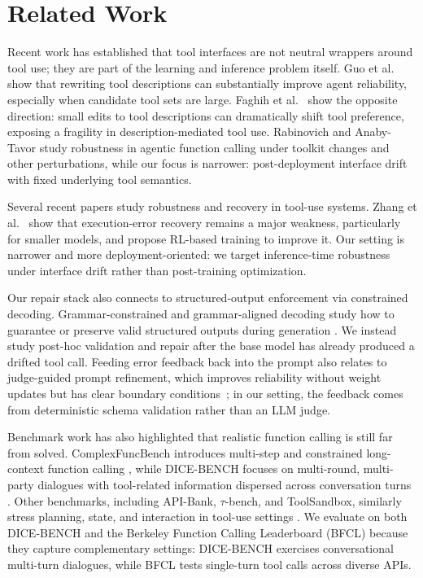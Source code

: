 \documentclass[runningheads]{llncs}
\begin{document}
\section{Related Work}
Recent work has established that tool interfaces are not neutral wrappers around
tool use; they are part of the learning and inference problem itself.
Guo et al.~\cite{guo2026rewrite} show that rewriting tool descriptions can
substantially improve agent reliability, especially when candidate tool sets are
large. Faghih et al.~\cite{faghih2025gaming} show the opposite direction:
small edits to tool descriptions can dramatically shift tool preference, exposing a
fragility in description-mediated tool use. Rabinovich and Anaby-Tavor
\cite{rabinovich2025robustness} study robustness in agentic function calling under
toolkit changes and other perturbations, while our focus is narrower: post-deployment
interface drift with fixed underlying tool semantics.

Several recent papers study robustness and recovery in tool-use systems.
Zhang et al.~\cite{zhang2026fission} show that execution-error recovery remains a
major weakness, particularly for smaller models, and propose RL-based training to
improve it. Our setting is narrower and more deployment-oriented: we target
inference-time robustness under interface drift rather than post-training
optimization.

Our repair stack also connects to structured-output enforcement via constrained
decoding. Grammar-constrained and grammar-aligned decoding study how to guarantee
or preserve valid structured outputs during generation
\cite{geng2023grammar,park2024grammar}. We instead study post-hoc validation and
repair after the base model has already produced a drifted tool call.
Feeding error feedback back into the prompt also relates to judge-guided prompt
refinement, which improves reliability without weight updates but has clear
boundary conditions~\cite{chattopadhyay2026metatuning}; in our setting, the
feedback comes from deterministic schema validation rather than an LLM judge.

Benchmark work has also highlighted that realistic function calling is still far from
solved. ComplexFuncBench introduces multi-step and constrained long-context function
calling \cite{zhong2025complexfuncbench}, while DICE-BENCH focuses on multi-round,
multi-party dialogues with tool-related information dispersed across conversation
turns \cite{jang2025dicebench}. Other benchmarks, including API-Bank,
$\tau$-bench, and ToolSandbox, similarly stress planning, state, and interaction
in tool-use settings \cite{li2023apibank,yao2024taubench,lu2024toolsandbox}. We
evaluate on both DICE-BENCH and the Berkeley Function Calling Leaderboard (BFCL)
\cite{bfcl2024} because they capture complementary settings: DICE-BENCH exercises
conversational multi-turn dialogues, while BFCL tests single-turn tool calls across
diverse APIs.
\end{document}
